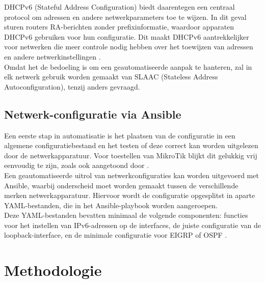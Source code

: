 DHCPv6 (Stateful Address Configuration) biedt daarentegen een centraal protocol om adressen en andere netwerkparameters toe te wijzen. 
In dit geval sturen routers RA-berichten zonder prefixinformatie, waardoor apparaten DHCPv6 gebruiken voor hun configuratie. 
Dit maakt DHCPv6 aantrekkelijker voor netwerken die meer controle nodig hebben over het toewijzen van adressen en andere netwerkinstellingen \autocite{Maris2024}.
\\

Omdat het de bedoeling is om een geautomatiseerde aanpak te hanteren, zal in elk netwerk gebruik worden gemaakt van SLAAC (Stateless Address Autoconfiguration), tenzij anders gevraagd.

\subsection{Netwerk-configuratie via Ansible}
\label{sec:netconfigAnsible}

Een eerste stap in automatisatie is het plaatsen van de configuratie in een algemene configuratiebestand en het testen of deze correct kan worden uitgelezen door de netwerkapparatuur. 
Voor toestellen van MikroTik blijkt dit gelukkig vrij eenvoudig te zijn, zoals ook aangetoond door \textcite{Arturs2022}.
\\

Een geautomatiseerde uitrol van netwerkconfiguraties kan worden uitgevoerd met Ansible, waarbij onderscheid moet worden gemaakt tussen de verschillende merken netwerkapparatuur. 
Hiervoor wordt de configuratie opgesplitst in aparte YAML-bestanden, die in het Ansible-playbook worden aangeroepen.
\\

Deze YAML-bestanden bevatten minimaal de volgende componenten: functies voor het instellen van IPv6-adressen op de interfaces, de juiste configuratie van de loopback-interface, 
en de minimale configuratie voor EIGRP of OSPF \autocite{MohdFuziMohdFaris2021}.



\section{Methodologie}%
\label{sec:methodologie}

